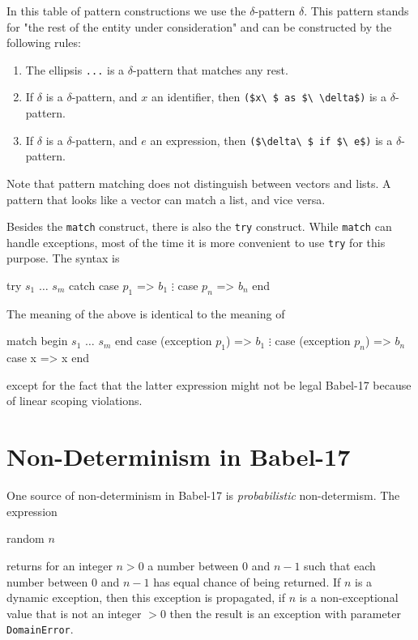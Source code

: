 \documentclass[11pt]{amsart}
\newcommand{\babelsrc}[1] {\lstinline!#1!}
\begin{document}
In this table of pattern constructions we use the $\delta$-pattern $\delta$. This pattern stands for "the rest of the entity under consideration" and can be constructed by the following rules:
\begin{enumerate}
\item The ellipsis \babelsrc{...} is a $\delta$-pattern that matches any rest.
\item If $\delta$ is a $\delta$-pattern, and $x$ an identifier, then \babelsrc{($x\ $ as $\ \delta$)} is a $\delta$-pattern.
\item If $\delta$ is a $\delta$-pattern, and $e$ an expression, then \babelsrc{($\delta\ $ if $\ e$)} is a $\delta$-pattern.
\end{enumerate}

Note that pattern matching does not distinguish between vectors and lists. A pattern that looks like a vector can match a list, and vice versa.

Besides the \babelsrc{match} construct, there is also the \babelsrc{try} construct. While \babelsrc{match} can handle exceptions, most of the time  it is more convenient to use \babelsrc{try} for this purpose. The syntax is 
\begin{babellisting}
try 
  $s_1$
  $\ldots$
  $s_m$
catch 
  case $p_1$ => $b_1$
  $\vdots$
  case $p_n$ => $b_n$
end  
\end{babellisting}
The meaning of the above is identical to the meaning of
\begin{babellisting}
match 
  begin 
    $s_1$
    $\ldots$
    $s_m$
  end
case (exception $p_1$) => $b_1$
  $\vdots$
case (exception $p_n$) => $b_n$
case x => x
end  
\end{babellisting}
except for the fact that the latter expression might not be legal Babel-17 because of linear scoping violations.

\section{Non-Determinism in Babel-17}

One source of non-determinism in Babel-17 is \emph{probabilistic} non-determism. The expression
\begin{babellisting}
random $n$
\end{babellisting}
returns for an integer $n > 0$ a number between $0$ and $n-1$ such that each number between $0$ and $n-1$ has equal chance of being returned. If $n$ is a dynamic exception, then this exception is propagated, if $n$ is a non-exceptional value that is not an integer $> 0$ then the result is an exception with parameter \babelsrc{DomainError}.
\end{document}
